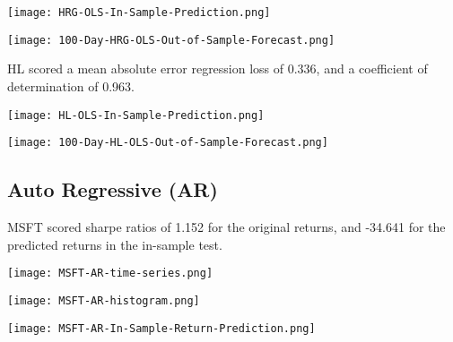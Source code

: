 \begin{center}  
    \texttt{[image: HRG-OLS-In-Sample-Prediction.png]}
    \label{fig:nonfloat}
\end{center}

\begin{center}
    \texttt{[image: 100-Day-HRG-OLS-Out-of-Sample-Forecast.png]}
    \label{fig:nonfloat}
\end{center}

HL scored a mean absolute error regression loss of 0.336, and a coefficient of determination of 0.963.

\begin{center}  
    \texttt{[image: HL-OLS-In-Sample-Prediction.png]}
    \label{fig:nonfloat}
\end{center}

\begin{center}
    \texttt{[image: 100-Day-HL-OLS-Out-of-Sample-Forecast.png]}
    \label{fig:nonfloat}
\end{center}

\subsection{Auto Regressive (AR)}

MSFT scored sharpe ratios of 1.152 for the original returns, and -34.641 for the predicted returns in the in-sample test.

\begin{center}  
    \texttt{[image: MSFT-AR-time-series.png]}
    \label{fig:nonfloat}
\end{center}

\begin{center}
    \texttt{[image: MSFT-AR-histogram.png]}
    \label{fig:nonfloat}
\end{center}

\begin{center}  
    \texttt{[image: MSFT-AR-In-Sample-Return-Prediction.png]}
    \label{fig:nonfloat}
\end{center}

